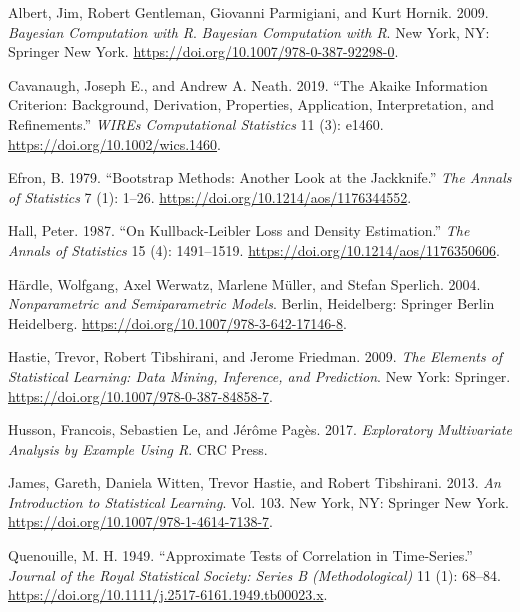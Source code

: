 \documentclass[
  12pt,
]{book}
\newlength{\cslhangindent}
\newlength{\cslentryspacingunit} %
\newenvironment{CSLReferences}[2] %
 {%
  \setlength{\parindent}{0pt}
  \ifodd #1
  \let\oldpar\par
  \def\par{\hangindent=\cslhangindent\oldpar}
  \fi
  \setlength{\parskip}{#2\cslentryspacingunit}
 }%
 {}
\begin{document}
\hypertarget{refs}{}
\begin{CSLReferences}{1}{0}
\leavevmode{}%
Albert, Jim, Robert Gentleman, Giovanni Parmigiani, and Kurt Hornik.
2009. \emph{Bayesian Computation with {R}}. \emph{Bayesian Computation
with R}. {New York, NY}: {Springer New York}.
\url{https://doi.org/10.1007/978-0-387-92298-0}.

\leavevmode{}%
Cavanaugh, Joseph E., and Andrew A. Neath. 2019. {``The {Akaike}
Information Criterion: {Background}, Derivation, Properties,
Application, Interpretation, and Refinements.''} \emph{WIREs
Computational Statistics} 11 (3): e1460.
\url{https://doi.org/10.1002/wics.1460}.

\leavevmode{}%
Efron, B. 1979. {``Bootstrap {Methods}: {Another Look} at the
{Jackknife}.''} \emph{The Annals of Statistics} 7 (1): 1--26.
\url{https://doi.org/10.1214/aos/1176344552}.

\leavevmode{}%
Hall, Peter. 1987. {``On {Kullback}-{Leibler Loss} and {Density
Estimation}.''} \emph{The Annals of Statistics} 15 (4): 1491--1519.
\url{https://doi.org/10.1214/aos/1176350606}.

\leavevmode{}%
Härdle, Wolfgang, Axel Werwatz, Marlene Müller, and Stefan Sperlich.
2004. \emph{Nonparametric and {Semiparametric Models}}. {Berlin,
Heidelberg}: {Springer Berlin Heidelberg}.
\url{https://doi.org/10.1007/978-3-642-17146-8}.

\leavevmode{}%
Hastie, Trevor, Robert Tibshirani, and Jerome Friedman. 2009. \emph{The
{Elements} of {Statistical Learning}: {Data} Mining, {Inference}, and
{Prediction}}. {New York}: {Springer}.
\url{https://doi.org/10.1007/978-0-387-84858-7}.

\leavevmode{}%
Husson, Francois, Sebastien Le, and Jérôme Pagès. 2017.
\emph{Exploratory {Multivariate Analysis} by {Example Using R}}. {CRC
Press}.

\leavevmode{}%
James, Gareth, Daniela Witten, Trevor Hastie, and Robert Tibshirani.
2013. \emph{An {Introduction} to {Statistical Learning}}. Vol. 103. {New
York, NY}: {Springer New York}.
\url{https://doi.org/10.1007/978-1-4614-7138-7}.

\leavevmode{}%
Quenouille, M. H. 1949. {``Approximate {Tests} of {Correlation} in
{Time}-{Series}.''} \emph{Journal of the Royal Statistical Society:
Series B (Methodological)} 11 (1): 68--84.
\url{https://doi.org/10.1111/j.2517-6161.1949.tb00023.x}.


\end{CSLReferences}
\end{document}
